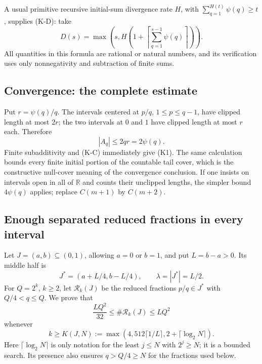A usual primitive recursive initial-sum divergence rate $H$, with
$\sum_{q=1}^{H(t)}\psi(q)\geq t$, supplies (K-D): take
\[
 D(s)=\max\left(s,H\left(1+\left\lceil
       \sum_{q=1}^{s-1}\psi(q)\right\rceil\right)\right).
\]
All quantities in this formula are rational or natural numbers, and its
verification uses only nonnegativity and subtraction of finite sums.

\subsection{Convergence: the complete estimate}

Put $r=\psi(q)/q$.  The intervals centered at $p/q$, $1\leq p\leq q-1$,
have clipped length at most $2r$; the two intervals at $0$ and $1$ have
clipped length at most $r$ each.  Therefore
\[
 |A_q|\leq2qr=2\psi(q).
\]
Finite subadditivity and (K-C) immediately give (K1).  The same calculation
bounds every finite initial portion of the countable tail cover, which is
the constructive null-cover meaning of the convergence conclusion.  If
one insists on intervals open in all of $\mathbb R$ and counts their
unclipped lengths, the simpler bound $4\psi(q)$ applies; replace
$C(m+1)$ by $C(m+2)$.

\subsection{Enough separated reduced fractions in every interval}

Let $J=(a,b)\subseteq(0,1)$, allowing $a=0$ or $b=1$, and put $L=b-a>0$.
Its middle half is
\[
 J^*=(a+L/4,b-L/4),\qquad \lambda=|J^*|=L/2.
\]
For $Q=2^k$, $k\geq2$, let $\mathcal R_k(J)$ be the reduced fractions
$p/q\in J^*$ with $Q/4<q\leq Q$.  We prove that
\[
 \frac{LQ^2}{32}\leq\#\mathcal R_k(J)\leq LQ^2
 \tag{K3}
\]
whenever
\[
 k\geq K(J,N):=
 \max\left(4,512\lceil1/L\rceil,2+\lceil\log_2N\rceil\right).
 \tag{K4}
\]
Here $\lceil\log_2N\rceil$ is only notation for the least $j\leq N$
with $2^j\geq N$; it is a bounded search.  Its presence also ensures
$q>Q/4\geq N$ for the fractions used below.

